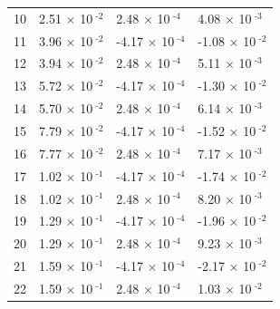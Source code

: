 \documentclass[a4paper,11pt]{article}
\begin{document}
\begin{center}
\begin{longtable}{|R{1.5cm}|R{2.5cm}|R{2.5cm}|R{2.5cm}|}
   10 &         2.51 $\times$ 10$^{\text{          -2}}$  &         2.48 $\times$ 10$^{\text{          -4}}$  &         4.08 $\times$ 10$^{\text{          -3}}$ \\ 
   11 &         3.96 $\times$ 10$^{\text{          -2}}$  &        -4.17 $\times$ 10$^{\text{          -4}}$  &        -1.08 $\times$ 10$^{\text{          -2}}$ \\ 
   12 &         3.94 $\times$ 10$^{\text{          -2}}$  &         2.48 $\times$ 10$^{\text{          -4}}$  &         5.11 $\times$ 10$^{\text{          -3}}$ \\ 
   13 &         5.72 $\times$ 10$^{\text{          -2}}$  &        -4.17 $\times$ 10$^{\text{          -4}}$  &        -1.30 $\times$ 10$^{\text{          -2}}$ \\ 
   14 &         5.70 $\times$ 10$^{\text{          -2}}$  &         2.48 $\times$ 10$^{\text{          -4}}$  &         6.14 $\times$ 10$^{\text{          -3}}$ \\ 
   15 &         7.79 $\times$ 10$^{\text{          -2}}$  &        -4.17 $\times$ 10$^{\text{          -4}}$  &        -1.52 $\times$ 10$^{\text{          -2}}$ \\ 
   16 &         7.77 $\times$ 10$^{\text{          -2}}$  &         2.48 $\times$ 10$^{\text{          -4}}$  &         7.17 $\times$ 10$^{\text{          -3}}$ \\ 
   17 &         1.02 $\times$ 10$^{\text{          -1}}$  &        -4.17 $\times$ 10$^{\text{          -4}}$  &        -1.74 $\times$ 10$^{\text{          -2}}$ \\ 
   18 &         1.02 $\times$ 10$^{\text{          -1}}$  &         2.48 $\times$ 10$^{\text{          -4}}$  &         8.20 $\times$ 10$^{\text{          -3}}$ \\ 
   19 &         1.29 $\times$ 10$^{\text{          -1}}$  &        -4.17 $\times$ 10$^{\text{          -4}}$  &        -1.96 $\times$ 10$^{\text{          -2}}$ \\ 
   20 &         1.29 $\times$ 10$^{\text{          -1}}$  &         2.48 $\times$ 10$^{\text{          -4}}$  &         9.23 $\times$ 10$^{\text{          -3}}$ \\ 
   21 &         1.59 $\times$ 10$^{\text{          -1}}$  &        -4.17 $\times$ 10$^{\text{          -4}}$  &        -2.17 $\times$ 10$^{\text{          -2}}$ \\ 
   22 &         1.59 $\times$ 10$^{\text{          -1}}$  &         2.48 $\times$ 10$^{\text{          -4}}$  &         1.03 $\times$ 10$^{\text{          -2}}$ \\ 

\end{longtable}
\end{center}
\end{document}
